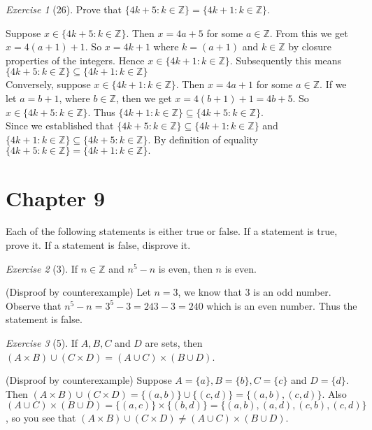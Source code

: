 \documentclass[12pt]{amsart}
\makeatletter
\theoremstyle{remark}
\newtheorem*{exercise}{Exercise}%
\def\ZZ{\ensuremath{\mathbb Z}}
\renewenvironment{proof}[1][\proofname]{\par\doublespacing
  \pushQED{\qed}%
  \normalfont \topsep6\p@\@plus6\p@\relax
  \list{}{%
    \settowidth{\leftmargin}{\itshape\proofname:\hskip\labelsep}%
    \setlength{\labelwidth}{0pt}%
    \setlength{\itemindent}{-\leftmargin}%
  }%
  \item[\hskip\labelsep\itshape#1\@addpunct{:}]\ignorespaces
}{%
  \popQED\endlist\@endpefalse
  \singlespacing
}
\theoremstyle{mycomment}
\makeatother
\begin{document}
\begin{exercise}[26] Prove that $\{4k+5:k\in\ZZ\}=\{4k+1:k\in\ZZ\}$.
\begin{proof}%
Suppose $x \in \{4k + 5: k \in \ZZ\}$. Then $x = 4a + 5$ for some $a \in \ZZ$. From this we get $x = 4(a + 1) + 1$. So $x = 4k + 1$ where $k = (a + 1)$ and $k \in \ZZ$ by closure properties of the integers. Hence $x \in \{4k+1:k\in\ZZ\}$. Subsequently this means $\{4k + 5:k \in \ZZ\} \subseteq \{4k+1:k\in\ZZ\}$ \\
Conversely, suppose $x \in \{4k+1:k\in\ZZ\}$. Then $x = 4a + 1$ for some $a \in \ZZ$. If we let $a = b+1$, where $b \in \ZZ$, then we get $x = 4(b+1) + 1 = 4b + 5$. So $x \in \{4k+5:k\in\ZZ\}$. Thus $\{4k+1:k\in\ZZ\} \subseteq \{4k+5:k\in\ZZ\}$. \\
Since we established that $\{4k+5:k\in\ZZ\} \subseteq \{4k+1:k\in\ZZ\}$ and $\{4k + 1: k \in \ZZ\} \subseteq \{4k+5: k \in \ZZ \}$. By definition of equality $\{4k+5:k\in\ZZ\}=\{4k+1:k\in\ZZ\}.$
\end{proof}
\end{exercise}
\section*{Chapter 9}

Each of the following statements is either true or false. If a statement is true, prove
it. If a statement is false, disprove it. 
\begin{exercise}[3] If $n\in \ZZ$ and $n^{5}-n$ is even, then $n$ is even.
\begin{proof}%
  (Disproof by counterexample) Let $n = 3$, we know that $3$ is an odd number. Observe that $n^5 - n = 3^5 - 3 = 243 - 3 = 240$ which is an even number. Thus the statement is false. 
\end{proof}
\end{exercise}

\begin{exercise}[5] If $A, B, C$ and $D$ are sets, then $(A\times B)\cup(C\times D)=(A\cup C)\times (B\cup D)$.
\begin{proof}%
  (Disproof by counterexample) Suppose $A = \{a\}, B = \{b\}, C = \{c\}$ and $D = \{d\}$. Then $(A \times B) \cup (C \times D) = \{(a,b)\} \cup \{(c,d)\} = \{(a,b),(c,d)\}$. Also $(A \cup C) \times (B \cup D) = \{(a,c)\} \times \{(b,d)\} = \{(a,b),(a,d),(c,b),(c,d)\}$, so you see that $(A\times B)\cup(C\times D) \neq (A\cup C)\times (B\cup D)$.
\end{proof}
\end{exercise}
\end{document}
